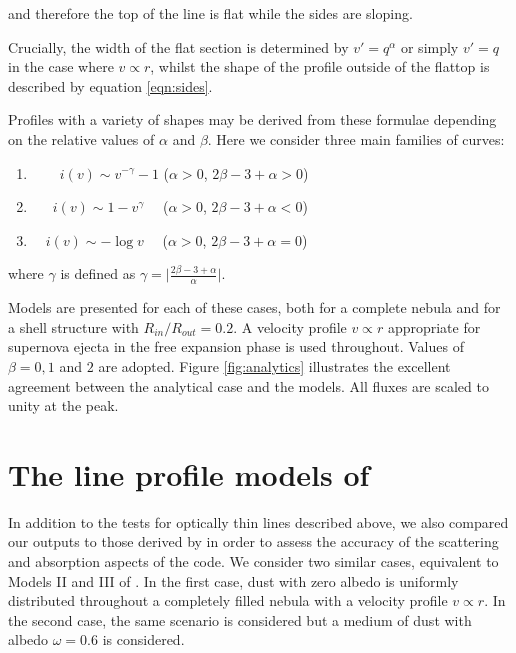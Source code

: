 \noindent and therefore the top of the line is flat while the sides are 
sloping.

Crucially, the width of the flat section is determined by $v'=q^\alpha$ or 
simply $v'=q$ in the case where $v \propto r$, whilst the shape of the 
profile outside of the flattop is described by equation \ref{eqn:sides}.

Profiles with a variety of shapes may be derived from these formulae 
depending on the relative values of $\alpha$ and $\beta$.  Here we 
consider three main families of curves:


\begin{enumerate}\parskip3pt

	\item \ \ $\quad i(v)  \sim v^{-\gamma}-1$ \quad ($\alpha>0$, $2\beta-3+\alpha>0$)
	\item \ $\quad i(v)  \sim 1-v^\gamma$ \quad \ \ ($\alpha>0$, $2\beta-3+\alpha<0$)
	\item  $\quad i(v) \sim -\log v$ \quad \ \ ($\alpha>0$, $2\beta-3+\alpha=0$)

\end{enumerate}


\noindent where $\gamma$ is defined as $\gamma= \lvert 
\frac{2\beta-3+\alpha}{\alpha} \rvert$.

Models are presented for each of these cases, both for a 
complete nebula and for a shell structure with $R_{in}/R_{out}=0.2$.  
A velocity profile $v \propto r$ appropriate for supernova ejecta in the free 
expansion phase is used throughout.  Values of $\beta = 0, 1$ and $2$ are 
adopted.  Figure \ref{fig:analytics} illustrates the excellent agreement between 
the analytical case and the models.  All fluxes are scaled to unity at the peak.

\section{The line profile models of \citet{Lucy1989}}
\label{opt_thick_testing}

In addition to the tests for optically thin lines described above, we also 
compared our outputs to those derived by \citet{Lucy1989} in order to 
assess the accuracy of the scattering and absorption aspects of the code.  
We consider two similar cases, equivalent to Models II and III of 
\citet{Lucy1989}. In the first case, dust with zero albedo is 
uniformly distributed throughout a completely filled nebula with a velocity profile 
$v \propto r$.  In the second case, the same scenario is considered but a 
medium of dust with albedo $\omega =0.6$ is considered.

